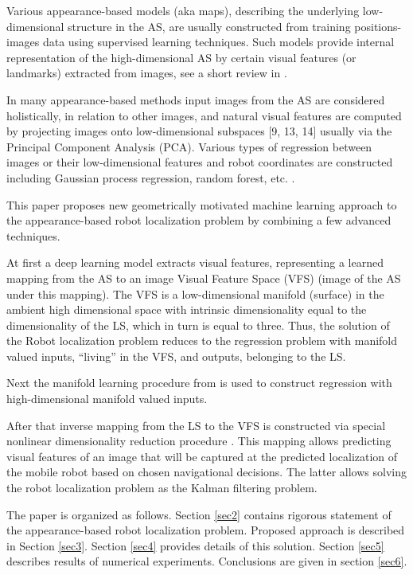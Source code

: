\documentclass[conference]{IEEEtran} %
\begin{document}
Various appearance-based models (aka maps), describing the underlying low-dimensional structure in the AS, are usually constructed from training positions-images data using supervised learning techniques. Such models provide internal representation of the high-dimensional AS by certain visual features (or landmarks) extracted from images, see a short review in \cite{bib12}.

In many appearance-based methods input images from the AS are considered holistically, in relation to other images, and natural visual features are computed by projecting images onto low-dimensional subspaces [9, 13, 14] usually via the Principal Component Analysis (PCA). Various types of regression between images or their low-dimensional features and robot coordinates are constructed including Gaussian process regression, random forest, etc. \cite{bib15,bib16,bib17,bib18,bib19,burn1,burn2,burn3}.

This paper proposes new geometrically motivated machine learning approach to the appearance-based robot localization problem by combining a few advanced techniques.

At first a deep learning model extracts visual features, representing a learned mapping from the AS to an image Visual Feature Space (VFS) (image of the AS under this mapping). The VFS is a low-dimensional manifold (surface) in the ambient high dimensional space with intrinsic dimensionality equal to the dimensionality of the LS, which in turn is equal to three. Thus, the solution of the Robot localization problem reduces to the regression problem with manifold valued inputs, ``living'' in the VFS, and outputs, belonging to the LS. 

Next the manifold learning procedure from \cite{bib20} is used to construct regression with high-dimensional manifold valued inputs.

After that inverse mapping from the LS to the VFS is constructed via special nonlinear dimensionality reduction procedure \cite{bib21,bib22,bib23}. This mapping allows predicting visual features of an image that will be captured at the predicted localization of the mobile robot based on chosen navigational decisions. The latter allows solving the robot localization problem as the Kalman filtering problem.

The paper is organized as follows. Section \ref{sec2} contains rigorous statement of the appearance-based robot localization problem. Proposed approach is described in Section \ref{sec3}. Section \ref{sec4} provides details of this solution. Section \ref{sec5} describes results of numerical experiments. Conclusions are given in section \ref{sec6}.
\end{document}
